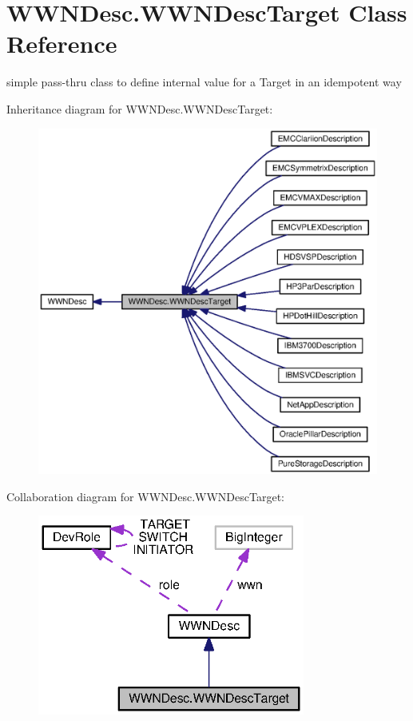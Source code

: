 \section{W\+W\+N\+Desc.\+W\+W\+N\+Desc\+Target Class Reference}
\label{classorg_1_1smallfoot_1_1wwn_1_1WWNDesc_1_1WWNDescTarget}


simple pass-\/thru class to define internal value for a Target in an idempotent way  




Inheritance diagram for W\+W\+N\+Desc.\+W\+W\+N\+Desc\+Target\+:\nopagebreak
\begin{figure}[H]
\begin{center}
\leavevmode
\includegraphics[width=350pt]{classorg_1_1smallfoot_1_1wwn_1_1WWNDesc_1_1WWNDescTarget__inherit__graph}
\end{center}
\end{figure}


Collaboration diagram for W\+W\+N\+Desc.\+W\+W\+N\+Desc\+Target\+:\nopagebreak
\begin{figure}[H]
\begin{center}
\leavevmode
\includegraphics[width=249pt]{classorg_1_1smallfoot_1_1wwn_1_1WWNDesc_1_1WWNDescTarget__coll__graph}
\end{center}
\end{figure}
